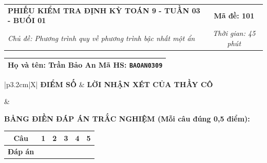 \documentclass[12pt,a4paper]{article}
\begin{document}
\pagestyle{empty}



\noindent
\begin{tabularx}{\linewidth}{|X|c|}
\hline
\textbf{PHIẾU KIỂM TRA ĐỊNH KỲ TOÁN 9 - TUẦN 03 - BUỔI 01} & \textbf{Mã đề: 101} \\
\textit{Chủ đề: Phương trình quy về phương trình bậc nhất một ẩn} & \textit{Thời gian: 45 phút} \\
\hline
\end{tabularx}

\vspace{1mm}

\noindent
\begin{tabularx}{\linewidth}{|X|}
\hline
\rule[-2mm]{0pt}{7.5mm}\textbf{Họ và tên:} \textbf{\large Trần Bảo An} \hfill \textbf{Mã HS:} \texttt{BAOAN0309} \quad \\
\hline
\end{tabularx}

\vspace{1mm}

\noindent
\begin{tabularx}{\linewidth}{|p{3.2cm}|X|}
\hline
\centering\textbf{ĐIỂM SỐ} & \centering\textbf{LỜI NHẬN XÉT CỦA THẦY CÔ} \tabularnewline
\hline
\rule{0pt}{1.3cm} & \tabularnewline
\hline
\end{tabularx}

\vspace{1.2mm}

\noindent\textbf{BẢNG ĐIỀN ĐÁP ÁN TRẮC NGHIỆM (Mỗi câu đúng 0,5 điểm):}
\vspace{0.8mm}

\noindent
\renewcommand{\arraystretch}{1.35}
\begin{tabularx}{\linewidth}{|c|*{5}{>{\centering\arraybackslash}X|}}
\hline
\textbf{Câu} & \textbf{1} & \textbf{2} & \textbf{3} & \textbf{4} & \textbf{5} \\
\hline
\textbf{Đáp án} & & & & & \\
\hline
\end{tabularx}
\renewcommand{\arraystretch}{1.0}

\vspace{1.5mm}
\end{document}

